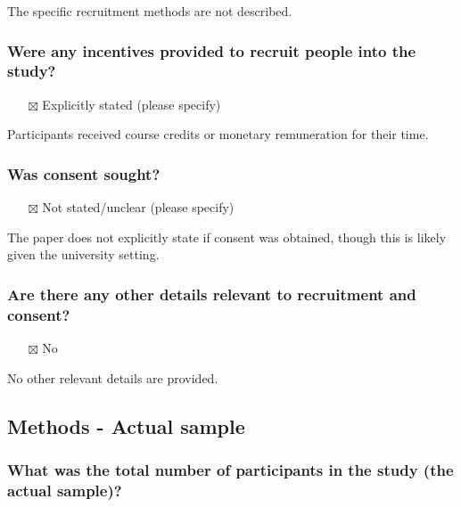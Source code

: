 \documentclass[
  doc, a4paper]{apa7}
\providecommand{\tightlist}{%
  \setlength{\itemsep}{0pt}\setlength{\parskip}{0pt}}
\begin{document}
The specific recruitment methods are not described.

\subsubsection{Were any incentives provided to recruit people into the study?}\label{were-any-incentives-provided-to-recruit-people-into-the-study}

\begin{itemize}
\tightlist
\item[$\boxtimes$]
  Explicitly stated (please specify)
\end{itemize}

Participants received course credits or monetary remuneration for their time.

\subsubsection{Was consent sought?}\label{was-consent-sought}

\begin{itemize}
\tightlist
\item[$\boxtimes$]
  Not stated/unclear (please specify)
\end{itemize}

The paper does not explicitly state if consent was obtained, though this is likely given the university setting.

\subsubsection{Are there any other details relevant to recruitment and consent?}\label{are-there-any-other-details-relevant-to-recruitment-and-consent}

\begin{itemize}
\tightlist
\item[$\boxtimes$]
  No
\end{itemize}

No other relevant details are provided.

\subsection{Methods - Actual sample}\label{methods---actual-sample}

\subsubsection{What was the total number of participants in the study (the actual sample)?}\label{what-was-the-total-number-of-participants-in-the-study-the-actual-sample}
\end{document}
